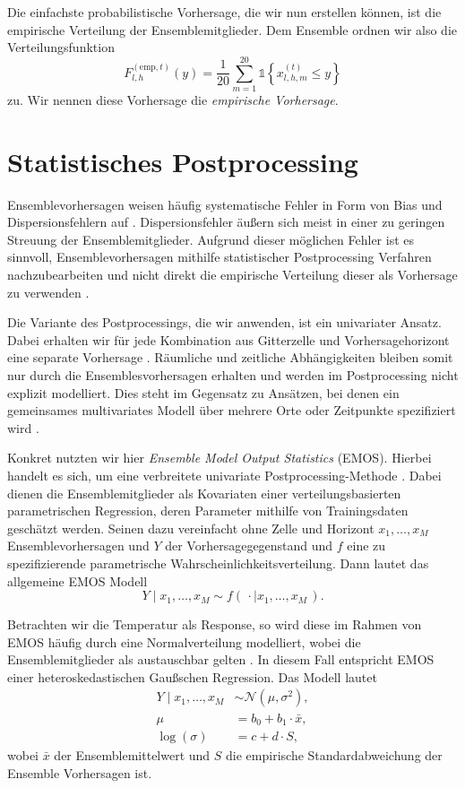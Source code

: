 Die einfachste probabilistische Vorhersage, die wir nun erstellen können, ist die empirische Verteilung der Ensemblemitglieder. Dem Ensemble ordnen wir also die Verteilungsfunktion
\[
F_{l,h}^{(\mathrm{emp},t)}(y)= \frac{1}{20}\sum_{m=1}^{20} \mathds{1}\!\left\{x_{l,h,m}^{(t)}\le y\right\}
\]
zu. Wir nennen diese Vorhersage die \emph{empirische Vorhersage}.


\section{Statistisches Postprocessing}\label{sec:postproc}
Ensemblevorhersagen weisen häufig systematische Fehler in Form von Bias und Dispersionsfehlern auf \parencite{vannitsem_statistical_2021}. Dispersionsfehler äußern sich meist in einer zu geringen Streuung der Ensemblemitglieder. Aufgrund dieser möglichen Fehler ist es sinnvoll, Ensemblevorhersagen mithilfe statistischer Postprocessing Verfahren nachzubearbeiten und nicht direkt die empirische Verteilung dieser als Vorhersage zu verwenden \parencite{vannitsem_statistical_2021, gneiting2014probabilistic}.

Die Variante des Postprocessings, die wir anwenden, ist ein univariater Ansatz. Dabei erhalten wir für jede Kombination aus Gitterzelle und Vorhersagehorizont eine separate Vorhersage \parencite{climaguidelines}. Räumliche und zeitliche Abhängigkeiten bleiben somit nur durch die Ensemblesvorhersagen erhalten und werden im Postprocessing nicht explizit modelliert. Dies steht im Gegensatz zu Ansätzen, bei denen ein gemeinsames multivariates Modell über mehrere Orte oder Zeitpunkte spezifiziert wird \parencite{vannitsem_statistical_2021}.

Konkret nutzten wir hier  \emph{Ensemble Model Output Statistics} (EMOS). Hierbei handelt es sich, um eine verbreitete univariate Postprocessing-Methode \parencite{gneiting2005emos,gebetsberger2018estimation}. Dabei dienen die Ensemblemitglieder als Kovariaten einer verteilungsbasierten parametrischen Regression, deren Parameter mithilfe von Trainingsdaten geschätzt werden. Seinen dazu vereinfacht ohne Zelle und Horizont  $x_1,\dotsc,x_M$ Ensemblevorhersagen und $Y$ der Vorhersagegegenstand und $f$ eine zu spezifizierende parametrische Wahrscheinlichkeitsverteilung. Dann lautet das allgemeine EMOS Modell
\[
Y \mid x_1,\dotsc,x_M \sim f(\,\cdot \mid x_1,\dotsc,x_M\,).
\]

Betrachten wir die Temperatur als Response, so wird diese im Rahmen von EMOS häufig durch eine Normalverteilung modelliert, wobei die Ensemblemitglieder als austauschbar gelten \parencite{gneiting2014probabilistic}. In diesem Fall entspricht EMOS einer heteroskedastischen Gaußschen Regression.  Das Modell lautet
\begin{equation} \label{eq:emos}
\begin{split}
Y \mid x_1, \dotsc, x_M &\sim \mathcal{N}(\mu, \sigma^2),\\
\mu &= b_0 + b_1 \cdot \bar{x},\\
\log(\sigma) &= c + d \cdot S,
\end{split}
\end{equation}
wobei $\bar{x}$ der Ensemblemittelwert und $S$ die empirische Standardabweichung der Ensemble Vorhersagen ist.  

